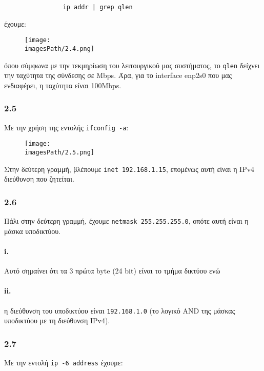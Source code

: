 			\begin{verbatim}
				ip addr | grep qlen
			\end{verbatim}
			
			έχουμε:
			
			\begin{figure}[H]
				\texttt{[image: \\imagesPath/2.4.png]}
			\end{figure}
		
			όπου σύμφωνα με την τεκμηρίωση του λειτουργικού μας συστήματος, το \verb|qlen| δείχνει την ταχύτητα της σύνδεσης σε Mbps. Άρα, για το interface enp2s0 που μας ενδιαφέρει, η ταχύτητα είναι 100Mbps.
			
		\subsubsection*{2.5}
		
			Με την χρήση της εντολής \verb|ifconfig -a|:
			
			\begin{figure}[H]
				\texttt{[image: \\imagesPath/2.5.png]}
			\end{figure}
		
			Στην δεύτερη γραμμή, βλέπουμε \verb|inet 192.168.1.15|, επομένως αυτή είναι η IPv4 διεύθυνση που ζητείται.
		
		\subsubsection*{2.6}
			Πάλι στην δεύτερη γραμμή, έχουμε \verb|netmask 255.255.255.0|, οπότε αυτή είναι η μάσκα υποδικτύου.
								
			\paragraph{i.}
			
			Αυτό σημαίνει ότι τα 3 πρώτα byte (24 bit) είναι το τμήμα δικτύου ενώ	
			
			\paragraph{ii.}
			
			η διεύθυνση του υποδικτύου είναι \verb|192.168.1.0| (το λογικό AND της μάσκας υποδικτύου με τη διεύθυνση IPv4).
		
		\subsubsection*{2.7}
			Με την εντολή \verb|ip -6 address| έχουμε:
			
